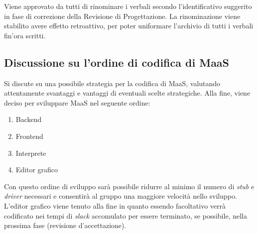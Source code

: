 \documentclass[11pt]{meetingmins}
\begin{document}
Viene approvato da tutti di rinominare i verbali secondo l'identificativo suggerito in fase di correzione della Revisione di Progettazione. La rinominazione viene stabilito avere effetto retroattivo, per poter uniformare l'archivio di tutti i verbali fin'ora scritti.

\subsection{Discussione su l'ordine di codifica di MaaS}

Si discute su una possibile strategia per la codifica di MaaS, valutando attentamente svantaggi e vantaggi di eventuali scelte strategiche. Alla fine, viene deciso per sviluppare MaaS nel seguente ordine:
\begin{enumerate}

\item Backend
\item Frontend
\item Interprete
\item Editor grafico
\end{enumerate}

Con questo ordine di sviluppo sar\`a possibile ridurre al minimo il numero di \textit{stub} e \textit{driver} necessari e consentir\`a al gruppo una maggiore velocit\`a nello sviluppo. L'editor grafico viene tenuto alla fine in quanto essendo facoltativo verr\`a codificato nei tempi di \textit{slack} accomulato per essere terminato, se possibile, nella prossima fase (revisione d'accettazione).


\end{document}
